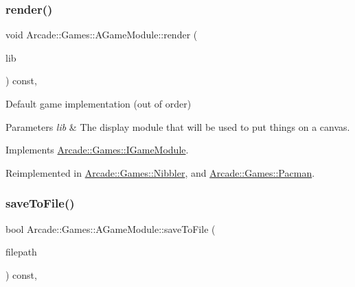 \subsubsection{\texorpdfstring{render()}{render()}}
{\footnotesize\ttfamily void Arcade\+::\+Games\+::\+A\+Game\+Module\+::render (\begin{DoxyParamCaption}\item[{\mbox{\hyperlink{classArcade_1_1Display_1_1IDisplayModule}{Arcade\+::\+Display\+::\+I\+Display\+Module}} \&}]{lib }\end{DoxyParamCaption}) const\hspace{0.3cm}{\ttfamily [override]}, {\ttfamily [virtual]}}



Default game implementation (out of order) 


\begin{DoxyParams}{Parameters}
{\em lib} & The display module that will be used to put things on a canvas. \\
\hline
\end{DoxyParams}


Implements \mbox{\hyperlink{classArcade_1_1Games_1_1IGameModule_afd5ec66681e77038e3d4dc17f43e1ee9}{Arcade\+::\+Games\+::\+I\+Game\+Module}}.



Reimplemented in \mbox{\hyperlink{classArcade_1_1Games_1_1Nibbler_afd52ee2fad66523b58f94f9eb582145e}{Arcade\+::\+Games\+::\+Nibbler}}, and \mbox{\hyperlink{classArcade_1_1Games_1_1Pacman_a624e0f9332f888fc585a17290cf80041}{Arcade\+::\+Games\+::\+Pacman}}.

\mbox{\label{classArcade_1_1Games_1_1AGameModule_a16425d9ca7518acbc60fbece4a974009}} 
\subsubsection{\texorpdfstring{saveToFile()}{saveToFile()}\hspace{0.1cm}{\footnotesize\ttfamily [1/2]}}
{\footnotesize\ttfamily bool Arcade\+::\+Games\+::\+A\+Game\+Module\+::save\+To\+File (\begin{DoxyParamCaption}\item[{const std\+::string \&}]{filepath }\end{DoxyParamCaption}) const\hspace{0.3cm}{\ttfamily [final]}, {\ttfamily [virtual]}}



